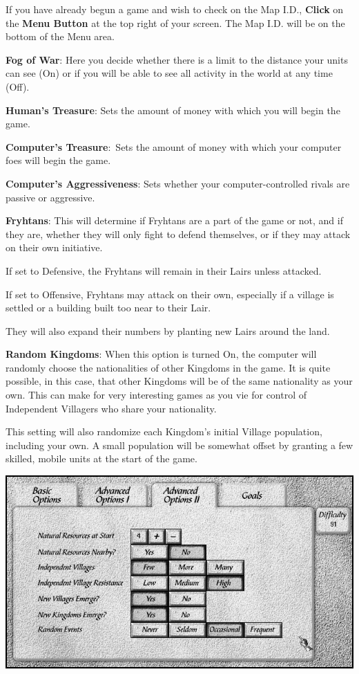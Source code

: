 \begin{adjustwidth}{1cm}{}
 If you have already begun a game and wish to check on the Map I.D., \textbf{Click} on the \textbf{Menu Button} at the top right of your screen. The Map I.D. will be on the bottom of the Menu area.
\end{adjustwidth}

\textbf{Fog of War}: Here you decide whether there is a limit to the distance your units can see (On) or if you will be able to see all activity in the world at any time (Off).

\textbf{Human’s Treasure}: Sets the amount of money with which you will begin the game.

\textbf{Computer’s Treasure}: Sets the amount of money with which your computer foes will begin the game.

\textbf{Computer’s Aggressiveness}: Sets whether your computer-controlled rivals are passive or aggressive.

\textbf{Fryhtans}: This will determine if Fryhtans are a part of the game or not, and if they are, whether they will only fight to defend themselves, or if they may attack on their own initiative.

\begin{adjustwidth}{1cm}{}
If set to Defensive, the Fryhtans will remain in their Lairs unless attacked.

If set to Offensive, Fryhtans may attack on their own, especially if a village is settled or a building built too near to their Lair. 

They will also expand their numbers by planting new Lairs around the land.
\end{adjustwidth}

\textbf{Random Kingdoms}: When this option is turned On, the computer will randomly choose the nationalities of other Kingdoms in the game. It is quite possible, in this case, that other Kingdoms will be of the same nationality as your own. This can make for very interesting games as you vie for control of Independent Villagers who share your nationality.

This setting will also randomize each Kingdom’s initial Village population, including your own. A small population will be somewhat offset by granting a few skilled, mobile units at the start of the game.

\begin{center}
	\includegraphics[width=0.7\linewidth]{Iadvancedoptions2}
\end{center}

